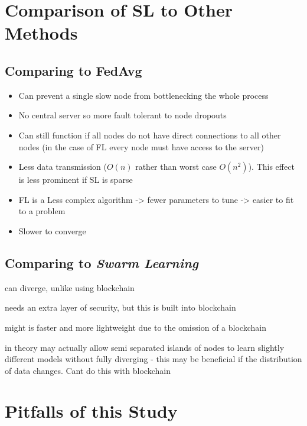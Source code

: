 \section{Comparison of SL to Other Methods}

\subsection{Comparing \SL to FedAvg}

\begin{itemize}
	\item Can prevent a single slow node from bottlenecking the whole process
	\item No central server so more fault tolerant to node dropouts
	\item Can still function if all nodes do not have direct connections to all other nodes (in the case of FL every node must have access to the server)
\end{itemize}


\begin{itemize}
	\item Less data transmission ($O(n)$ rather than worst case $O(n^2)$). This effect is less prominent if SL is sparse
	\item FL is a Less complex algorithm -> fewer parameters to tune -> easier to fit to a problem
	\item Slower to converge
\end{itemize}

\subsection{Comparing \SL to \emph{Swarm Learning}}

\SL can diverge, unlike using blockchain

\SL needs an extra layer of security, but this is built into blockchain

\SL might is faster and more lightweight due to the omission of a blockchain

\SL in theory may actually allow semi separated islands of nodes to learn slightly different models without fully diverging - this may be beneficial if the distribution of data changes. Cant do this with blockchain

\section{Pitfalls of this Study}

